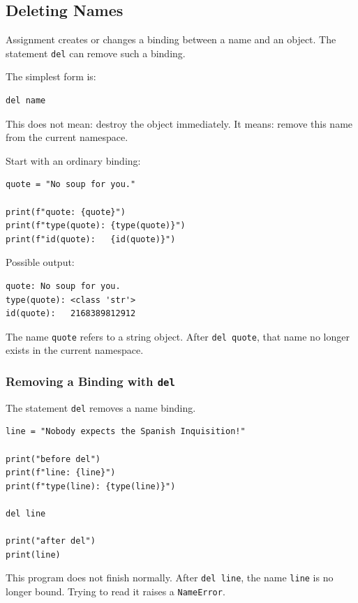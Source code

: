\subsection{Deleting Names}

Assignment creates or changes a binding between a name and an object. The statement \texttt{del} can remove such a binding.

The simplest form is:

\begin{verbatim}
del name
\end{verbatim}

This does not mean: destroy the object immediately. It means: remove this name from the current namespace.

Start with an ordinary binding:

\begin{verbatim}
quote = "No soup for you."

print(f"quote: {quote}")
print(f"type(quote): {type(quote)}")
print(f"id(quote):   {id(quote)}")
\end{verbatim}

Possible output:

\begin{verbatim}
quote: No soup for you.
type(quote): <class 'str'>
id(quote):   2168389812912
\end{verbatim}

The name \texttt{quote} refers to a string object. After \texttt{del quote}, that name no longer exists in the current namespace.

\subsubsection{Removing a Binding with \texttt{del}}

The statement \texttt{del} removes a name binding.

\begin{verbatim}
line = "Nobody expects the Spanish Inquisition!"

print("before del")
print(f"line: {line}")
print(f"type(line): {type(line)}")

del line

print("after del")
print(line)
\end{verbatim}

This program does not finish normally. After \texttt{del line}, the name \texttt{line} is no longer bound. Trying to read it raises a \texttt{NameError}.

